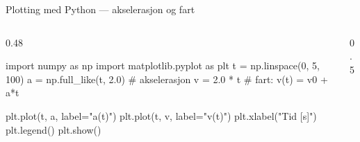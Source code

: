 \documentclass[aspectratio=169, 12pt]{beamer}
\begin{document}
\begin{frame}[fragile]{Plotting med Python --- akselerasjon og fart}

  \begin{columns}[t]
    \begin{column}{0.48\textwidth}
\begin{pycode}
import numpy as np
import matplotlib.pyplot as plt
t = np.linspace(0, 5, 100)
a = np.full_like(t, 2.0)   # akselerasjon
v = 2.0 * t                # fart: v(t) = v0 + a*t

plt.plot(t, a, label="a(t)")
plt.plot(t, v, label="v(t)")
plt.xlabel("Tid [s]")
plt.legend()
plt.show()
\end{pycode}
    \end{column}
    \begin{column}{0.5\textwidth}
      \begin{center}
      \end{center}
    \end{column}
  \end{columns}

\end{frame}
\end{document}
